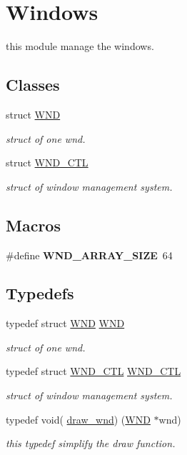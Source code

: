 \hypertarget{group__windows}{}\section{Windows}
\label{group__windows}


this module manage the windows.  


\subsection*{Classes}
\begin{DoxyCompactItemize}
\item 
struct \hyperlink{struct_w_n_d}{W\+N\+D}
\begin{DoxyCompactList}\small\item\em struct of one wnd. \end{DoxyCompactList}\item 
struct \hyperlink{struct_w_n_d___c_t_l}{W\+N\+D\+\_\+\+C\+T\+L}
\begin{DoxyCompactList}\small\item\em struct of window management system. \end{DoxyCompactList}\end{DoxyCompactItemize}
\subsection*{Macros}
\begin{DoxyCompactItemize}
\item 
\hypertarget{group__windows_ga5ac2320ffa8a8c6b1ce7e0c796636b80}{}\#define {\bfseries W\+N\+D\+\_\+\+A\+R\+R\+A\+Y\+\_\+\+S\+I\+Z\+E}~64\label{group__windows_ga5ac2320ffa8a8c6b1ce7e0c796636b80}

\end{DoxyCompactItemize}
\subsection*{Typedefs}
\begin{DoxyCompactItemize}
\item 
typedef struct \hyperlink{struct_w_n_d}{W\+N\+D} \hyperlink{group__windows_gae0c9d0c82c2d2fe9937ca50b8f18cbbe}{W\+N\+D}
\begin{DoxyCompactList}\small\item\em struct of one wnd. \end{DoxyCompactList}\item 
typedef struct \hyperlink{struct_w_n_d___c_t_l}{W\+N\+D\+\_\+\+C\+T\+L} \hyperlink{group__windows_gaccac09d5e99a04140ddb6e87e24988f8}{W\+N\+D\+\_\+\+C\+T\+L}
\begin{DoxyCompactList}\small\item\em struct of window management system. \end{DoxyCompactList}\item 
typedef void( \hyperlink{group__windows_gac65b8e04920935e2abbadbc41b8bec92}{draw\+\_\+wnd}) (\hyperlink{struct_w_n_d}{W\+N\+D} $\ast$wnd)
\begin{DoxyCompactList}\small\item\em this typedef simplify the draw function. \end{DoxyCompactList}\end{DoxyCompactItemize}
